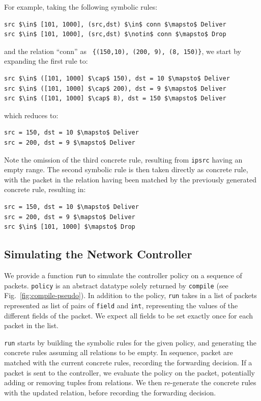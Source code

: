 \documentclass[preprint]{sigplanconf}
\begin{document}
For example, taking the following symbolic rules: 
  \begin{lstlisting}[mathescape]
src $\in$ [101, 1000], (src,dst) $\in$ conn $\mapsto$ Deliver
src $\in$ [101, 1000], (src,dst) $\notin$ conn $\mapsto$ Drop
  \end{lstlisting}
  and the relation ``conn'' as \lstinline| {(150,10), (200, 9), (8, 150)}|, we start by expanding the first rule to:
\begin{lstlisting}[mathescape]
src $\in$ ([101, 1000] $\cap$ 150), dst = 10 $\mapsto$ Deliver
src $\in$ ([101, 1000] $\cap$ 200), dst = 9 $\mapsto$ Deliver
src $\in$ ([101, 1000] $\cap$ 8), dst = 150 $\mapsto$ Deliver
 \end{lstlisting}
which reduces to:
\begin{lstlisting}[mathescape]
src = 150, dst = 10 $\mapsto$ Deliver
src = 200, dst = 9 $\mapsto$ Deliver
 \end{lstlisting}
Note the omission of the third concrete rule, resulting from \lstinline|ipsrc| having an empty range. The second symbolic rule is then taken directly as concrete rule, with the packet in the relation having been matched by the previously generated concrete rule, resulting in:
\begin{lstlisting}[mathescape]
src = 150, dst = 10 $\mapsto$ Deliver
src = 200, dst = 9 $\mapsto$ Deliver
src $\in$ [101, 1000] $\mapsto$ Drop
\end{lstlisting}

\subsection*{Simulating the Network Controller}

We provide a function \lstinline|run| to simulate the controller policy on a sequence of packets. \lstinline|policy| is an abstract datatype solely returned by \lstinline|compile| (see Fig.~\ref{fig:compile-pseudo}). In addition to the policy, \lstinline|run| takes in a list of packets represented as list of pairs of \lstinline|field| and \lstinline|int|, representing the values of the different fields of the packet. We expect all fields to be set exactly once for each packet in the list.

\lstinline|run| starts by building the symbolic rules for the given policy, and generating the concrete rules assuming all relations to be empty. In sequence, packet are matched with the current concrete rules, recording the forwarding decision. If a packet is sent to the controller, we evaluate the policy on the packet, potentially adding or removing tuples from relations. We then re-generate the concrete rules with the updated relation, before recording the forwarding decision.
\end{document}
